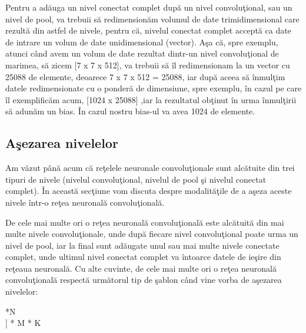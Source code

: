 Pentru a ad\u{a}uga un nivel conectat complet dup\u{a} un nivel convolu\c{t}ional, sau un nivel de pool, va trebuii s\u{a} redimension\u{a}m volumul de date trimidimensional care rezult\u{a} din astfel de nivele, pentru c\u{a}, nivelul conectat complet accept\u{a} ca date de intrare un volum de date unidimensional (vector). A\c{s}a c\u{a}, spre exemplu, atunci c\^{a}nd avem un volum de date rezultat dintr-un nivel convolu\c{t}ional de marimea, s\u{a} zicem [7 x 7 x 512], va trebuii s\u{a} \^{i}l redimensionam la un vector cu 25088 de elemente, deoarece 7 x 7 x 512 = 25088, iar dup\u{a} aceea s\u{a} \^{i}nmul\c{t}im datele redimensionate cu o ponder\u{a} de dimensiune, spre exemplu, \^{i}n cazul pe care \^{i}l exemplific\u{a}m acum, [1024 x 25088] ,iar la rezultatul ob\c{t}inut \^{i}n urma \^{i}nmul\c{t}irii s\u{a} adun\u{a}m un bias. \^{I}n cazul nostru bias-ul  va avea 1024 de elemente.

\subsection{A\c{s}ezarea nivelelor}

Am v\u{a}zut p\^{a}n\u{a} acum c\u{a} re\c{t}elele neuronale convolu\c{t}ionale sunt alc\u{a}tuite din trei tipuri de nivele (nivelul convolu\c{t}ional, nivelul de pool \c{s}i nivelul conectat complet). \^{I}n aceast\u{a} sec\c{t}iune vom discuta despre modalit\u{a}\c{t}ile de a a\c{s}eza aceste nivele \^{i}ntr-o re\c{t}ea neuronal\u{a} convolu\c{t}ional\u{a}.

\par

De cele mai multe ori o re\c{t}ea neuronal\u{a} convolu\c{t}ional\u{a} este alc\u{a}tuit\u{a} din mai multe nivele convolu\c{t}ionale, unde dup\u{a} fiecare nivel convolu\c{t}ional poate urma un nivel de pool, iar la final sunt ad\u{a}ugate unul sau mai multe nivele conectate complet, unde ultimul nivel conectat complet va \^{i}ntoarce datele de ie\c{s}ire din re\c{t}eaua neuronal\u{a}. Cu alte cuvinte, de cele mai multe ori o re\c{t}ea neuronal\u{a} convolu\c{t}ional\u{a} respect\u{a} urm\u{a}torul tip de \c{s}ablon c\^{a}nd vine vorba de a\c{s}ezarea nivelelor:

\par

 \longrightarrow [[\text{Nivel convolu\c{t}ional} \longrightarrow \text{ReLU}]*N \longrightarrow \\
\longrightarrow {} ] * M  * K  \longrightarrow \\
\longrightarrow {} \longrightarrow {}


